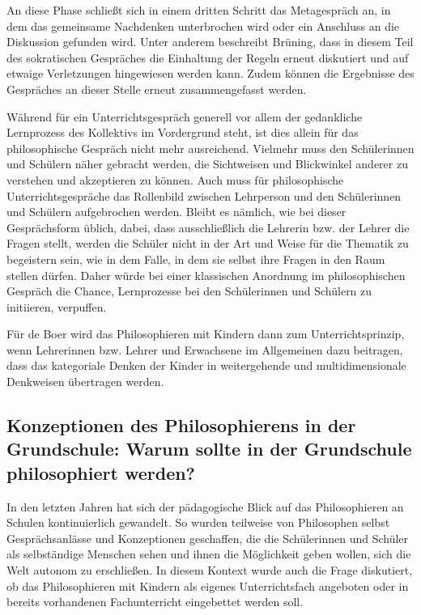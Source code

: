 An diese Phase schließt sich in einem dritten Schritt das Metagespräch an, in  dem das gemeinsame Nachdenken unterbrochen wird oder ein Anschluss an die Diskussion gefunden wird. 
Unter anderem beschreibt Brüning, dass in diesem Teil des sokratischen Gespräches die Einhaltung der Regeln erneut diskutiert und auf etwaige Verletzungen hingewiesen werden kann. 
Zudem können die Ergebnisse des Gespräches an dieser Stelle erneut zusammengefasst werden.

Während für ein Unterrichtsgespräch generell vor allem der gedankliche Lernprozess des Kollektivs im Vordergrund steht, ist dies allein für das philosophische Gespräch nicht mehr ausreichend. 
Vielmehr muss den Schülerinnen und Schülern näher gebracht werden, die Sichtweisen und Blickwinkel anderer zu verstehen und akzeptieren zu können\cite[S.\,234]{HDB15}. 
Auch muss für philosophische Unterrichtsgespräche das Rollenbild zwischen Lehrperson und den Schülerinnen und Schülern aufgebrochen werden. 
Bleibt es nämlich, wie bei dieser Gesprächsform üblich, dabei, dass ausschließlich die Lehrerin bzw. der Lehrer die Fragen stellt, werden die Schüler nicht in der Art und Weise für die Thematik zu begeistern sein, wie in dem Falle, in dem sie selbst ihre Fragen in den Raum stellen dürfen. 
Daher würde bei einer klassischen Anordnung im philosophischen Gespräch die Chance, Lernprozesse bei den Schülerinnen und Schülern zu initiieren, verpuffen.

Für de Boer wird das Philosophieren mit Kindern dann zum Unterrichtsprinzip, wenn Lehrerinnen bzw. Lehrer und Erwachsene im Allgemeinen dazu beitragen, dass das kategoriale Denken der Kinder in weitergehende und multidimensionale Denkweisen übertragen werden.


\newpage
\subsection{Konzeptionen des Philosophierens in der Grundschule: Warum sollte in der Grundschule philosophiert werden?}

In den letzten Jahren hat sich der pädagogische Blick auf das Philosophieren an Schulen kontinuierlich gewandelt. 
So wurden teilweise von Philosophen selbst Gesprächsanlässe und Konzeptionen geschaffen, die die Schülerinnen und Schüler als selbständige Menschen sehen und ihnen die Möglichkeit geben wollen, sich die Welt autonom zu erschließen\cite[S.\,617]{AN13}. 
In diesem Kontext wurde auch die Frage diskutiert, ob das Philosophieren mit Kindern als eigenes Unterrichtsfach angeboten oder in bereits vorhandenen Fachunterricht eingebettet werden soll. 

